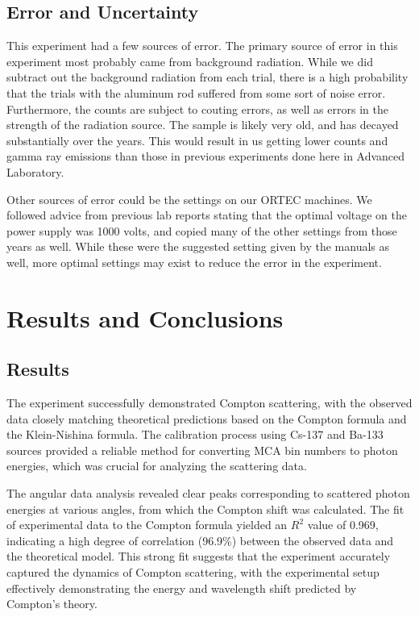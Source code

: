\documentclass[10pt,letterpaper,onecolumn]{article}
\begin{document}
\subsection{Error and Uncertainty}
This experiment had a few sources of error. The primary source of error in this experiment most probably came from background radiation. While we did subtract out the background radiation from each trial, there is a high probability that the trials with the aluminum rod suffered from some sort of noise error. Furthermore, the counts are subject to couting errors, as well as errors in the strength of the radiation source. The sample is likely very old, and has decayed substantially over the years. This would result in us getting lower counts and gamma ray emissions than those in previous experiments done here in Advanced Laboratory. 

Other sources of error could be the settings on our ORTEC machines. We followed advice from previous lab reports stating that the optimal voltage on the power supply was 1000 volts, and copied many of the other settings from those years as well. While these were the suggested setting given by the manuals as well, more optimal settings may exist to reduce the error in the experiment.

\section{Results and Conclusions}
\subsection{Results}
The experiment successfully demonstrated Compton scattering, with the observed data closely matching theoretical predictions based on the Compton formula and the Klein-Nishina formula. The calibration process using Cs-137 and Ba-133 sources provided a reliable method for converting MCA bin numbers to photon energies, which was crucial for analyzing the scattering data.

The angular data analysis revealed clear peaks corresponding to scattered photon energies at various angles, from which the Compton shift was calculated. The fit of experimental data to the Compton formula yielded an \(R^2\) value of 0.969, indicating a high degree of correlation (96.9\%) between the observed data and the theoretical model. This strong fit suggests that the experiment accurately captured the dynamics of Compton scattering, with the experimental setup effectively demonstrating the energy and wavelength shift predicted by Compton's theory.
\end{document}
